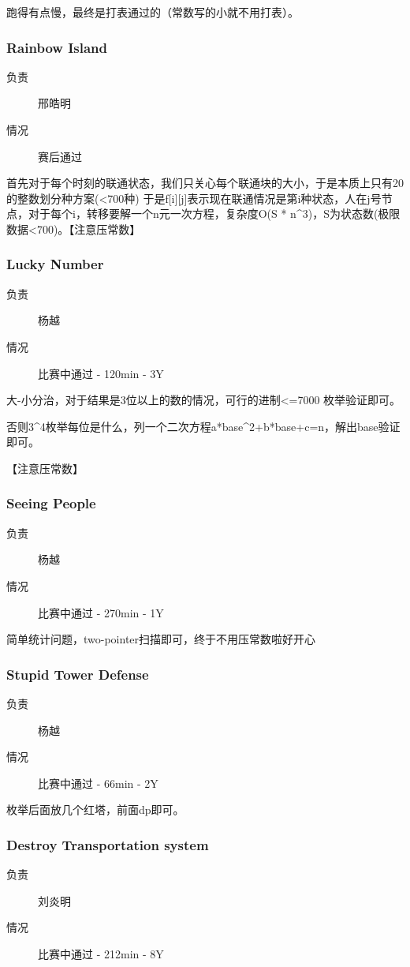 \documentclass[a4paper, 11pt, nofonts, nocap, fancyhdr]{ctexart}
\newcommand{\problem}[1]{\subsubsection{#1}}
\begin{document}
跑得有点慢，最终是打表通过的（常数写的小就不用打表）。

\problem{Rainbow Island}

\begin{description}
\item[负责] 邢皓明
\item[情况] 赛后通过
\end{description}

首先对于每个时刻的联通状态，我们只关心每个联通块的大小，于是本质上只有20的整数划分种方案(<700种)
于是f[i][j]表示现在联通情况是第i种状态，人在j号节点，对于每个i，转移要解一个n元一次方程，复杂度O(S * n^3)，S为状态数(极限数据<700)。【注意压常数】

\problem{Lucky Number}

\begin{description}
\item[负责] 杨越
\item[情况] 比赛中通过 - 120min - 3Y
\end{description}

大-小分治，对于结果是3位以上的数的情况，可行的进制<=7000 枚举验证即可。

否则3^4枚举每位是什么，列一个二次方程a*base^2+b*base+c=n，解出base验证即可。

【注意压常数】

\problem{Seeing People}

\begin{description}
\item[负责] 杨越
\item[情况] 比赛中通过 - 270min - 1Y
\end{description}

简单统计问题，two-pointer扫描即可，终于不用压常数啦好开心

\problem{Stupid Tower Defense}

\begin{description}
\item[负责] 杨越
\item[情况] 比赛中通过 - 66min - 2Y
\end{description}

枚举后面放几个红塔，前面dp即可。

\problem{Destroy Transportation system}

\begin{description}
\item[负责] 刘炎明
\item[情况] 比赛中通过 - 212min - 8Y
\end{description}
\end{document}
